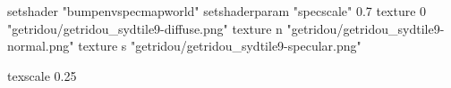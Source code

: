 setshader "bumpenvspecmapworld"
setshaderparam "specscale" 0.7
texture 0 "getridou/getridou_sydtile9-diffuse.png"
texture n "getridou/getridou_sydtile9-normal.png"
texture s "getridou/getridou_sydtile9-specular.png"

texscale 0.25
